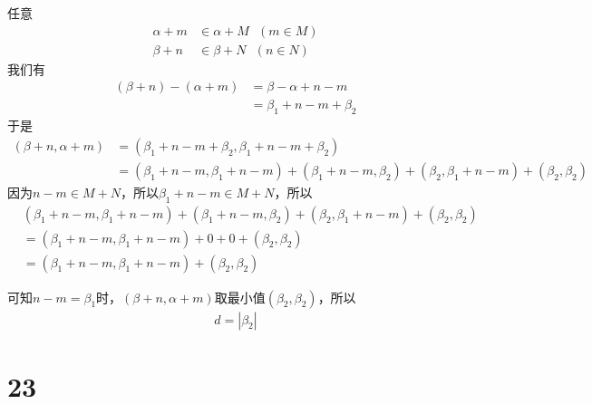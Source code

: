 \documentclass{article}
\begin{document}
任意
\begin{align*}
  \alpha + m & \in \alpha + M \ \ \ (m \in M) \\
  \beta + n  & \in \beta + N \ \ \ (n \in N)
\end{align*}
我们有
\begin{align*}
  (\beta + n) - (\alpha + m)
   & = \beta - \alpha + n - m    \\
   & = \beta_1 + n - m + \beta_2
\end{align*}
于是
\begin{align*}
  (\beta + n, \alpha + m)
   & = (\beta_1 + n - m + \beta_2, \beta_1 + n - m + \beta_2)          \\
   & = (\beta_1 + n - m, \beta_1 + n - m) + (\beta_1 + n - m, \beta_2)
  + (\beta_2, \beta_1 + n - m) + (\beta_2, \beta_2)
\end{align*}
因为$n - m \in M + N$，所以$\beta_1 + n - m \in M + N$，所以
\begin{align*}
   & (\beta_1 + n - m, \beta_1 + n - m) + (\beta_1 + n - m, \beta_2)
  + (\beta_2, \beta_1 + n - m) + (\beta_2, \beta_2)                    \\
   & = (\beta_1 + n - m, \beta_1 + n - m) + 0 + 0 + (\beta_2, \beta_2) \\
   & = (\beta_1 + n - m, \beta_1 + n - m) + (\beta_2, \beta_2)
\end{align*}

可知$n - m = \beta_1$时，$(\beta + n, \alpha + m)$取最小值$(\beta_2, \beta_2)$，所以
\begin{align*}
  d = |\beta_2|
\end{align*}

\section*{23}
\end{document}
